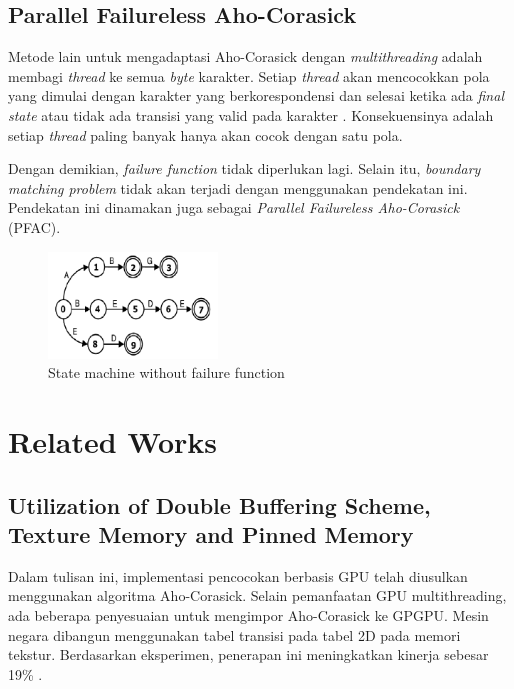\documentclass[conference]{IEEEtran}
\begin{document}
    \subsection{Parallel Failureless Aho-Corasick}
    Metode lain untuk mengadaptasi Aho-Corasick dengan \emph{multithreading} adalah membagi \emph{thread} ke semua \emph{byte} karakter. Setiap \emph{thread} akan mencocokkan pola yang dimulai dengan karakter yang berkorespondensi dan selesai ketika ada \emph{final state} atau tidak ada transisi yang valid pada karakter \cite{lin2013}. Konsekuensinya adalah setiap \emph{thread} paling banyak hanya akan cocok dengan satu pola.
    
    Dengan demikian, \emph{failure function} tidak diperlukan lagi. Selain itu, \emph{boundary matching problem} tidak akan terjadi dengan menggunakan pendekatan ini. Pendekatan ini dinamakan juga sebagai \emph{Parallel Failureless Aho-Corasick} (PFAC).

    \begin{figure}[htbp]
        \centerline{\includegraphics[width=0.4\textwidth]{../src/resources/pfac.png}}
        \caption{State machine without failure function}
    \end{figure} 

\section{Related Works}

    \subsection{Utilization of Double Buffering Scheme, Texture Memory and Pinned Memory}

        Dalam tulisan ini, implementasi pencocokan berbasis GPU telah diusulkan menggunakan algoritma Aho-Corasick. Selain pemanfaatan GPU multithreading, ada beberapa penyesuaian untuk mengimpor Aho-Corasick ke GPGPU. Mesin negara dibangun menggunakan tabel transisi pada tabel 2D pada memori tekstur. Berdasarkan eksperimen, penerapan ini meningkatkan kinerja sebesar 19\% \cite{gnort2008}.
        
\end{document}
